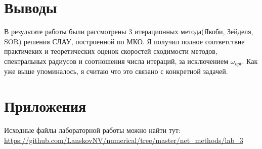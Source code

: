 \documentclass[12pt]{article}
\begin{document}
\newpage

\section{Выводы}

В результате работы были рассмотрены 3 итерационных метода(Якоби, Зейделя, SOR) решения СЛАУ, построенной по МКО. Я получил полное соответствие практичеких и теоретических оценок скоростей сходимости методов, спектральных радиусов и соотношения числа итераций, за исключением $\omega_{opt}$. Как уже выше упоминалось, я считаю что это связано с конкретной задачей.

\section{Приложения}
Исходные файлы лабораторной работы можно найти тут: \\
\url{https://github.com/LanskovNV/numerical/tree/master/net_methods/lab_3}
\end{document}
